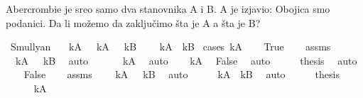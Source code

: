 \begin{isabellebody}
\begin{exercise}[subtitle=Logčki lavirinti.]
%
\begin{isamarkuptext}%
Abercrombie je sreo samo dva stanovnika A i B. 
      A je izjavio: Obojica smo podanici. 
      Da li možemo da zaključimo šta je A a šta je B?%
\end{isamarkuptext}\isamarkuptrue%
\isamarkupfalse%
\ Smullyan{\isacharunderscore}{\kern0pt}{}{\isacharunderscore}{\kern0pt}{}{\isacharcolon}{\kern0pt}\isanewline
\ \ \ {\isachardoublequoteopen}kA\ {\isasymlongleftrightarrow}\ {\isasymnot}\ kA\ {\isasymand}\ {\isasymnot}\ kB{\isachardoublequoteclose}\isanewline
\ \ \ {\isachardoublequoteopen}{\isasymnot}\ kA\ {\isasymand}\ kB{\isachardoublequoteclose}\isanewline
%
\isadelimproof
%
\endisadelimproof
%
\isatagproof
{}\isamarkupfalse%
\ {\isacharparenleft}{\kern0pt}cases\ kA{\isacharparenright}{\kern0pt}\isanewline
\ \ \isamarkupfalse%
\ True\isanewline
\ \ \isamarkupfalse%
\ assms\ \isamarkupfalse%
\ {\isachardoublequoteopen}{\isasymnot}\ kA\ {\isasymand}\ {\isasymnot}\ kB{\isachardoublequoteclose}\ \isamarkupfalse%
\ auto\isanewline
\ \ \isamarkupfalse%
\ \isamarkupfalse%
\ {\isachardoublequoteopen}{\isasymnot}\ kA{\isachardoublequoteclose}\ \isamarkupfalse%
\ auto\isanewline
\ \ \isamarkupfalse%
\ {\isacartoucheopen}kA{\isacartoucheclose}\ \isamarkupfalse%
\ False\ \isamarkupfalse%
\ auto\isanewline
\ \ \isamarkupfalse%
\ \isamarkupfalse%
\ {\isacharquery}{\kern0pt}thesis\ \isamarkupfalse%
\ auto\isanewline
{}\isamarkupfalse%
\isanewline
\ \ \isamarkupfalse%
\ False\isanewline
\ \ \isamarkupfalse%
\ assms\ \isamarkupfalse%
\ {\isachardoublequoteopen}{\isasymnot}\ {\isacharparenleft}{\kern0pt}{\isasymnot}\ kA\ {\isasymand}\ {\isasymnot}\ kB{\isacharparenright}{\kern0pt}{\isachardoublequoteclose}\ \isamarkupfalse%
\ auto\isanewline
\ \ \isamarkupfalse%
\ \isamarkupfalse%
\ {\isachardoublequoteopen}kA\ {\isasymor}\ kB{\isachardoublequoteclose}\ \isamarkupfalse%
\ auto\isanewline
\ \ \isamarkupfalse%
\ \isamarkupfalse%
\ {\isacharquery}{\kern0pt}thesis\isanewline
\ \ \isamarkupfalse%
\isanewline
\ \ \ \ \isamarkupfalse%
\ kA\isanewline
\ \ \ \ \isamarkupfalse%

\end{exercise}
\end{isabellebody}
